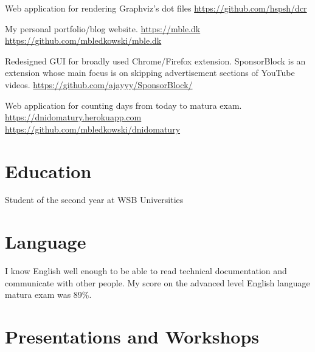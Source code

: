 \documentclass[11pt, a4paper, sans, colorlinks]{moderncv}
\begin{document}
{Web application for rendering Graphviz's dot files \href{https://github.com/hspsh/dcr}{https://github.com/hspsh/dcr}}

{My personal portfolio/blog website. \href{mble.dk}{https://mble.dk} \href{https://github.com/mbledkowski/mble.dk}{https://github.com/mbledkowski/mble.dk}}

{Redesigned GUI for broadly used Chrome/Firefox extension. SponsorBlock is an extension whose main focus is on skipping advertisement sections of YouTube videos. \href{https://github.com/ajayyy/SponsorBlock}{https://github.com/ajayyy/SponsorBlock/}}

{Web application for counting days from today to matura exam. \href{dnidomatury.herokuapp.com}{https://dnidomatury.herokuapp.com} \href{https://github.com/mbledkowski/dnidomatury}{https://github.com/mbledkowski/dnidomatury}}

\section{Education}

{Student of the second year at WSB Universities}

\pagebreak

\section{Language}

{I know English well enough to be able to read technical documentation and communicate with other people. My score on the advanced level English language matura exam was 89\%. }


\section{Presentations and Workshops}
\end{document}
